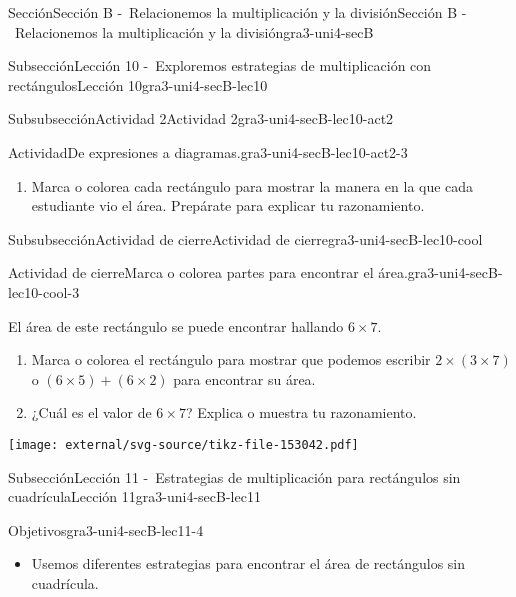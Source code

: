 \documentclass[twoside,10pt,]{article}
\begin{document}
\begin{sectionptx}{Sección}{Sección B -~Relacionemos la multiplicación y la división}{}{Sección B -~Relacionemos la multiplicación y la división}{}{}{gra3-uni4-secB}
\begin{subsectionptx}{Subsección}{Lección 10 -~Exploremos estrategias de multiplicación con rectángulos}{}{Lección 10}{}{}{gra3-uni4-secB-lec10}
\begin{subsubsectionptx}{Subsubsección}{Actividad 2}{}{Actividad 2}{}{}{gra3-uni4-secB-lec10-act2}
\begin{activity}{Actividad}{De expresiones a diagramas.}{gra3-uni4-secB-lec10-act2-3}
\begin{enumerate}
\item{}Marca o colorea cada rectángulo para mostrar la manera en la que cada estudiante vio el área. Prepárate para explicar tu razonamiento.%
\end{enumerate}
\end{activity}%
\end{subsubsectionptx}
%
%
\typeout{************************************************}
\typeout{************************************************}
%
\begin{subsubsectionptx}{Subsubsección}{Actividad de cierre}{}{Actividad de cierre}{}{}{gra3-uni4-secB-lec10-cool}
\begin{project}{Actividad de cierre}{Marca o colorea partes para encontrar el área.}{gra3-uni4-secB-lec10-cool-3}%
\begin{sidebyside}{2}{0}{0}{0}%
\begin{sbspanel}{0.6}%
El área de este rectángulo se puede encontrar hallando \(6 \times 7\).%
%
\begin{enumerate}
\item{}Marca o colorea el rectángulo para mostrar que podemos escribir \(2 \times (3 \times 7)\) o \((6 \times 5) + (6 \times 2)\) para encontrar su área.%
\item{}¿Cuál es el valor de \(6 \times 7\)? Explica o muestra tu razonamiento.%
\end{enumerate}
\end{sbspanel}%
\begin{sbspanel}{0.4}%
\texttt{[image: external/svg-source/tikz-file-153042.pdf]}
\end{sbspanel}%
\end{sidebyside}%
\end{project}%
\end{subsubsectionptx}
\end{subsectionptx}
%
%
\typeout{************************************************}
\typeout{************************************************}
%
\begin{subsectionptx}{Subsección}{Lección 11 -~Estrategias de multiplicación para rectángulos sin cuadrícula}{}{Lección 11}{}{}{gra3-uni4-secB-lec11}
\begin{objectives}{Objetivos}{gra3-uni4-secB-lec11-4}
%
\begin{itemize}[label=\textbullet]
\item{}Usemos diferentes estrategias para encontrar el área de rectángulos sin cuadrícula.%

\end{itemize}
\end{objectives}
\end{subsectionptx}
\end{sectionptx}
\end{document}
